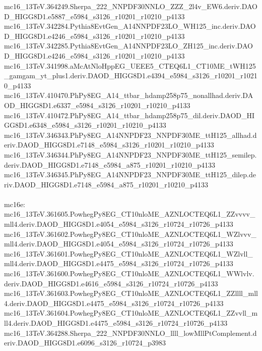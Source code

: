 mc16_13TeV.364249.Sherpa_222_NNPDF30NNLO_ZZZ_2l4v_EW6.deriv.DAOD_HIGG8D1.e5887_e5984_s3126_r10201_r10210_p4133 \\
mc16_13TeV.342284.Pythia8EvtGen_A14NNPDF23LO_WH125_inc.deriv.DAOD_HIGG8D1.e4246_e5984_s3126_r10201_r10210_p4133 \\
mc16_13TeV.342285.Pythia8EvtGen_A14NNPDF23LO_ZH125_inc.deriv.DAOD_HIGG8D1.e4246_e5984_s3126_r10201_r10210_p4133 \\
mc16_13TeV.341998.aMcAtNloHppEG_UEEE5_CTEQ6L1_CT10ME_tWH125_gamgam_yt_plus1.deriv.DAOD_HIGG8D1.e4394_e5984_s3126_r10201_r10210_p4133 \\
mc16_13TeV.410470.PhPy8EG_A14_ttbar_hdamp258p75_nonallhad.deriv.DAOD_HIGG8D1.e6337_e5984_s3126_r10201_r10210_p4133 \\
mc16_13TeV.410472.PhPy8EG_A14_ttbar_hdamp258p75_dil.deriv.DAOD_HIGG8D1.e6348_e5984_s3126_r10201_r10210_p4133 \\
mc16_13TeV.346343.PhPy8EG_A14NNPDF23_NNPDF30ME_ttH125_allhad.deriv.DAOD_HIGG8D1.e7148_e5984_s3126_r10201_r10210_p4133 \\
mc16_13TeV.346344.PhPy8EG_A14NNPDF23_NNPDF30ME_ttH125_semilep.deriv.DAOD_HIGG8D1.e7148_e5984_a875_r10201_r10210_p4133 \\
mc16_13TeV.346345.PhPy8EG_A14NNPDF23_NNPDF30ME_ttH125_dilep.deriv.DAOD_HIGG8D1.e7148_e5984_a875_r10201_r10210_p4133 \\
 \\
mc16e: \\
mc16_13TeV.361605.PowhegPy8EG_CT10nloME_AZNLOCTEQ6L1_ZZvvvv_mll4.deriv.DAOD_HIGG8D1.e4054_e5984_s3126_r10724_r10726_p4133 \\
mc16_13TeV.361602.PowhegPy8EG_CT10nloME_AZNLOCTEQ6L1_WZlvvv_mll4.deriv.DAOD_HIGG8D1.e4054_e5984_s3126_r10724_r10726_p4133 \\
mc16_13TeV.361601.PowhegPy8EG_CT10nloME_AZNLOCTEQ6L1_WZlvll_mll4.deriv.DAOD_HIGG8D1.e4475_e5984_s3126_r10724_r10726_p4133 \\
mc16_13TeV.361600.PowhegPy8EG_CT10nloME_AZNLOCTEQ6L1_WWlvlv.deriv.DAOD_HIGG8D1.e4616_e5984_s3126_r10724_r10726_p4133 \\
mc16_13TeV.361603.PowhegPy8EG_CT10nloME_AZNLOCTEQ6L1_ZZllll_mll4.deriv.DAOD_HIGG8D1.e4475_e5984_s3126_r10724_r10726_p4133 \\
mc16_13TeV.361604.PowhegPy8EG_CT10nloME_AZNLOCTEQ6L1_ZZvvll_mll4.deriv.DAOD_HIGG8D1.e4475_e5984_s3126_r10724_r10726_p4133 \\
mc16_13TeV.364288.Sherpa_222_NNPDF30NNLO_llll_lowMllPtComplement.deriv.DAOD_HIGG8D1.e6096_s3126_r10724_p3983
